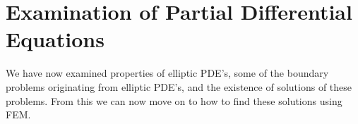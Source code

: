 \chapter{Examination of Partial Differential Equations}









We have now examined properties of elliptic PDE's, some of the boundary problems 
originating from elliptic PDE's, and the existence of solutions of these problems. 
From this we can now move on to how to find these solutions using FEM.